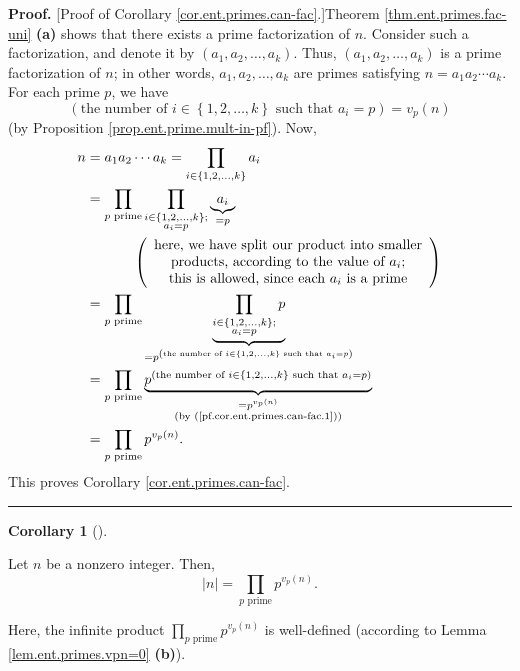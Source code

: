 \documentclass[numbers=enddot,12pt,final,onecolumn,notitlepage]{scrartcl}%
\numberwithin{exer}{subsection}
\theoremstyle{definition}
\newtheorem{coro}[theo]{Corollary}
\newenvironment{corollary}[1][]
{\begin{coro}[#1]\begin{leftbar}}
{\end{leftbar}\end{coro}}
\newenvironment{proof}[1][Proof]{\noindent\textbf{#1.} }{\ \rule{0.5em}{0.5em}}
\let\prodnonlimits\prod
\renewcommand{\prod}{\prodnonlimits\limits}
\begin{document}
\begin{proof}
[Proof of Corollary \ref{cor.ent.primes.can-fac}.]Theorem
\ref{thm.ent.primes.fac-uni} \textbf{(a)} shows that there exists a prime
factorization of $n$. Consider such a factorization, and denote it by $\left(
a_{1},a_{2},\ldots,a_{k}\right)  $. Thus, $\left(  a_{1},a_{2},\ldots
,a_{k}\right)  $ is a prime factorization of $n$; in other words, $a_{1}%
,a_{2},\ldots,a_{k}$ are primes satisfying $n=a_{1}a_{2}\cdots a_{k}$. For
each prime $p$, we have%
\begin{equation}
\left(  \text{the number of }i\in\left\{  1,2,\ldots,k\right\}  \text{ such
that }a_{i}=p\right)  =v_{p}\left(  n\right)
\label{pf.cor.ent.primes.can-fac.1}%
\end{equation}
(by Proposition \ref{prop.ent.prime.mult-in-pf}). Now,%
\begin{align*}
n  &  =a_{1}a_{2}\cdots a_{k}=\prod_{i\in\left\{  1,2,\ldots,k\right\}  }%
a_{i}\\
&  =\prod_{p\text{ prime}}\prod_{\substack{i\in\left\{  1,2,\ldots,k\right\}
;\\a_{i}=p}}\underbrace{a_{i}}_{=p}\\
&  \ \ \ \ \ \ \ \ \ \ \left(
\begin{array}
[c]{c}%
\text{here, we have split our product into smaller}\\
\text{products, according to the value of }a_{i}\text{;}\\
\text{this is allowed, since each }a_{i}\text{ is a prime}%
\end{array}
\right) \\
&  =\prod_{p\text{ prime}}\underbrace{\prod_{\substack{i\in\left\{
1,2,\ldots,k\right\}  ;\\a_{i}=p}}p}_{=p^{\left(  \text{the number of }%
i\in\left\{  1,2,\ldots,k\right\}  \text{ such that }a_{i}=p\right)  }}\\
&  =\prod_{p\text{ prime}}\underbrace{p^{\left(  \text{the number of }%
i\in\left\{  1,2,\ldots,k\right\}  \text{ such that }a_{i}=p\right)  }%
}_{\substack{=p^{v_{p}\left(  n\right)  }\\\text{(by
(\ref{pf.cor.ent.primes.can-fac.1}))}}}\\
&  =\prod_{p\text{ prime}}p^{v_{p}\left(  n\right)  }.
\end{align*}
This proves Corollary \ref{cor.ent.primes.can-fac}.
\end{proof}

\begin{corollary}
\label{cor.ent.primes.can-facZ}Let $n$ be a nonzero integer. Then,%
\[
\left\vert n\right\vert =\prod_{p\text{ prime}}p^{v_{p}\left(  n\right)  }.
\]


Here, the infinite product $\prod_{p\text{ prime}}p^{v_{p}\left(  n\right)  }$
is well-defined (according to Lemma \ref{lem.ent.primes.vpn=0} \textbf{(b)}).
\end{corollary}
\end{document}
